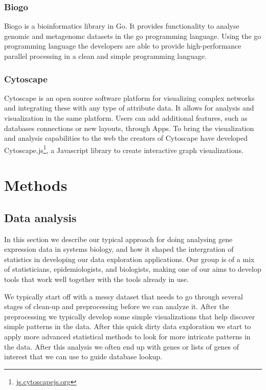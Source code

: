 \subsubsection*{Biogo} 
Biogo is a bioinformatics library in Go. It provides functionality to analyse
genomic and metagenomc datasets in the go programming
language.\cite{Kortschak005033} Using the go programming language the developers
are able to provide high-performance parallel processing in a clean and simple
programming language. 

\subsubsection*{Cytoscape} 
Cytoscape is an open source software platform for visualizing complex
networks and integrating these with any type of attribute
data\cite{shannon2003cytoscape}. It allows for analysis and visualization in the
same platform. Users can add additional features, such as databases connections
or new layouts, through Apps. To bring the visualization and analysis
capabilities to the web the creators of Cytoscape have developed
Cytoscape.js\footnote{\url{js.cytoscapejs.org}}, a Javascript library to create
interactive graph visualizations. 


\section*{Methods} 
\subsection*{Data analysis} 
In this section we describe our typical approach for doing analysing gene
expression data in systems biology, and how it shaped the intergration of
statistics in developing our data exploration applications. Our group is
of a mix of statisticians, epidemiologists, and biologists, making one of our
aims to develop tools that work well together with the tools already in use. 

We typically start off with a messy dataset that needs to go through
several stages of clean-up and preprocessing before we can analyze it. After the
preprocessing we typically develop some simple visualizations that help discover 
simple patterns in the data. After this quick dirty data exploration we start to
apply more advanced statistical methods to look for more intricate patterns in
the data. After this analysis we often end up with genes or lists of genes of
interest that we can use to guide database lookup. 

